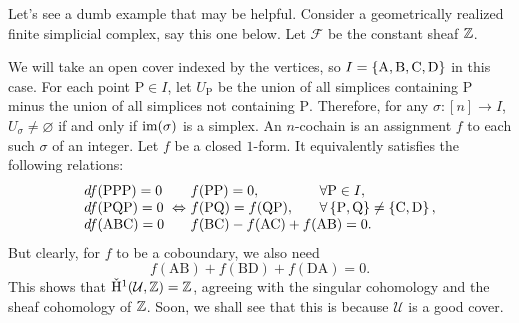 \documentclass{article}
\newcommand{\cH}{\check{\mathrm{H}}}
\begin{document}
\begin{example}

Let's see a dumb example that may be helpful. Consider a geometrically realized finite simplicial complex, say this one below. Let $\mathcal{F}$ be the constant sheaf $\mathbb{Z}$.

\begin{center}
\end{center}

We will take an open cover indexed by the vertices, so $I=\left\{\mathrm{A,B,C,D}\right\}$ in this case. For each point $\mathrm{P}\in I$, let ${U}_{\mathrm{P}}$ be the union of all simplices containing $\mathrm{P}$ minus the union of all simplices not containing $\mathrm{P}$. Therefore, for any $\sigma:[n]\to I$, $U_\sigma\neq\varnothing$ if and only if $\operatorname{im}(\sigma)$ is a simplex. An $n$-cochain is an assignment $f$ to each such $\sigma$ of an integer. Let $f$ be a closed $1$-form. It equivalently satisfies the following relations:
\begin{equation*}
\begin{array}{l@{}l@{\qquad}l}
    df(\mathrm{PPP}) = 0 & f(\mathrm{PP})=0, & \forall \mathrm{P}\in I, \\
    df(\mathrm{PQP}) = 0 \ \Leftrightarrow\ & f(\mathrm{PQ})=f(\mathrm{QP}), & \forall\bc{\mathrm{P,Q}}\neq\bc{\mathrm{C,D}}, \\
    df(\mathrm{ABC}) = 0 & \multicolumn{2}{@{}l}{f(\mathrm{BC})-f(\mathrm{AC})+f(\mathrm{AB})=0.}
\end{array}
\end{equation*}
But clearly, for $f$ to be a coboundary, we also need
\[
    f(\mathrm{AB}) + f(\mathrm{BD}) + f(\mathrm{DA}) = 0.
\]
This shows that $\cH^1(\mathcal{U},\Z)=\Z$, agreeing with the singular cohomology and the sheaf cohomology of $\mathbb{Z}$. Soon, we shall see that this is because $\mathcal{U}$ is a good cover.

\end{example}
\end{document}
